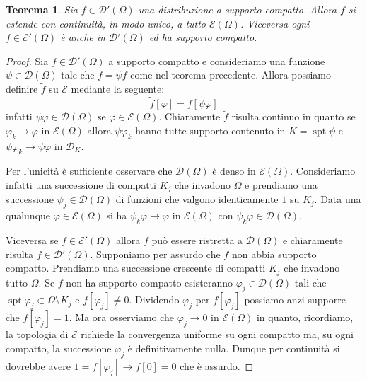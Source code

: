 \documentclass[italian,a4paper,oneside,headinclude]{scrbook}
\renewcommand{\phi}{\varphi}
\newcommand{\D}{\mathcal D}
\newcommand{\E}{\mathcal E}
\DeclareMathOperator{\spt}{spt}
\newtheorem{theorem}{Teorema}
\begin{document}
\begin{theorem}
  Sia $f\in \D'(\Omega)$ una distribuzione a supporto compatto. Allora
  $f$ si estende con continuità, in modo unico, a tutto $\E(\Omega)$.
  Viceversa ogni $f\in \E'(\Omega)$
  è anche in $\D'(\Omega)$ ed ha supporto compatto.
\end{theorem}
%
\begin{proof}
  Sia $f\in \D'(\Omega)$ a supporto compatto e consideriamo una funzione
  $\psi\in \D(\Omega)$ tale che $f=\psi f$ come nel teorema
  precedente. Allora possiamo definire $\tilde f$ su $\E$ mediante la
  seguente:
  \[
  \tilde f[\phi] = f[\psi \phi]
  \]
  infatti $\psi\phi\in \D(\Omega)$ se $\phi\in \E(\Omega)$. Chiaramente
  $\tilde f$ risulta continuo in quanto se $\phi_k\to \phi$ in
  $\E(\Omega)$ allora $\psi\phi_k$ hanno tutte supporto contenuto in
  $K=\spt \psi$ e $\psi\phi_k\to \psi\phi$ in $\D_K$.

  Per l'unicità è sufficiente osservare che $\D(\Omega)$ è denso in
  $\E(\Omega)$.
  Consideriamo infatti una successione di compatti $K_j$ che invadono $\Omega$
  e prendiamo una successione $\psi_j\in \D(\Omega)$ di funzioni che
  valgono identicamente $1$ su $K_j$.
  Data una qualunque $\phi\in\E(\Omega)$ si ha
  $\psi_k \phi \to \phi$ in $\E(\Omega)$ con $\psi_k\phi\in \D(\Omega)$.

  Viceversa se $f\in \E'(\Omega)$ allora $f$ può essere ristretta a
  $\D(\Omega)$ e chiaramente risulta $f\in\D'(\Omega)$. Supponiamo per
  assurdo che $f$ non abbia supporto compatto. Prendiamo una successione
  crescente di compatti $K_j$ che invadono tutto $\Omega$. Se $f$ non ha
  supporto compatto esisteranno $\phi_j\in \D(\Omega)$ tali che
  $\spt \phi_j \subset \Omega\setminus K_j$ e $f[\phi_j]\neq 0$.
  Dividendo $\phi_j$ per $f[\phi_j]$ possiamo anzi supporre che
  $f[\phi_j]=1$.
  Ma ora osserviamo che $\phi_j\to 0$ in $\E(\Omega)$ in quanto,
  ricordiamo, la topologia di $\E$ richiede la convergenza uniforme su
  ogni compatto ma, su ogni compatto, la successione $\phi_j$ è
  definitivamente nulla. Dunque per continuità si dovrebbe avere
  $1 = f[\phi_j]\to f[0] = 0$ che è assurdo.
\end{proof}
\end{document}
